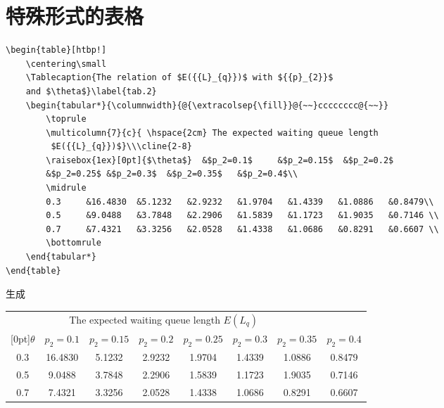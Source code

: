 \section{特殊形式的表格}\label{section3-3}
\begin{verbatim}
\begin{table}[htbp!]
	\centering\small
	\Tablecaption{The relation of $E({{L}_{q}})$ with ${{p}_{2}}$
    and $\theta$}\label{tab.2}
	\begin{tabular*}{\columnwidth}{@{\extracolsep{\fill}}@{~~}cccccccc@{~~}}
		\toprule
		\multicolumn{7}{c}{ \hspace{2cm} The expected waiting queue length
         $E({{L}_{q}})$}\\\cline{2-8}
		\raisebox{1ex}[0pt]{$\theta$}  &$p_2=0.1$     &$p_2=0.15$  &$p_2=0.2$
        &$p_2=0.25$ &$p_2=0.3$  &$p_2=0.35$   &$p_2=0.4$\\
		\midrule
		0.3     &16.4830  &5.1232   &2.9232   &1.9704   &1.4339   &1.0886   &0.8479\\
		0.5     &9.0488   &3.7848   &2.2906   &1.5839   &1.1723   &1.9035   &0.7146 \\
		0.7     &7.4321   &3.3256   &2.0528   &1.4338   &1.0686   &0.8291   &0.6607 \\
		\bottomrule
	\end{tabular*}	
\end{table}
\end{verbatim}
生成
\begin{table}[htbp!]
	\centering\small
	\label{tab.2}
	\begin{tabular*}{\columnwidth}{@{\extracolsep{\fill}}@{~~}cccccccc@{~~}}
		\toprule
		\multicolumn{7}{c}{ \hspace{2cm} The expected waiting queue length $E({{L}_{q}})$}\\
		\cline{2-8}
		\raisebox{1ex}[0pt]{$\theta$}  &$p_2=0.1$     &$p_2=0.15$  &$p_2=0.2$   &$p_2=0.25$
        &$p_2=0.3$  &$p_2=0.35$   &$p_2=0.4$\\
		\midrule
		0.3     &16.4830  &5.1232   &2.9232   &1.9704   &1.4339   &1.0886   &0.8479\\
		0.5     &9.0488   &3.7848   &2.2906   &1.5839   &1.1723   &1.9035   &0.7146 \\
		0.7     &7.4321   &3.3256   &2.0528   &1.4338   &1.0686   &0.8291   &0.6607 \\
		\bottomrule
	\end{tabular*}	
\end{table}

